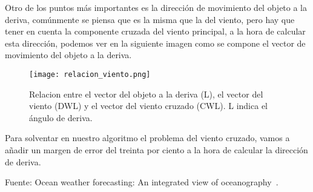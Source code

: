 Otro de los puntos más importantes es la dirección de movimiento del 
objeto a la deriva, comúnmente se piensa que es la misma que la del viento,
 pero hay que tener en cuenta la componente cruzada del viento principal, a
 la hora de calcular esta dirección, podemos ver en la siguiente imagen como 
se compone el vector de movimiento del objeto a la deriva.


\begin{figure}[h]
\texttt{[image: relacion\_viento.png]} 
\caption{Relacion entre el vector del objeto a la deriva (L), 
el vector del viento (DWL) y el vector del viento cruzado (CWL). L indica el ángulo de deriva. }
\end{figure}


Para solventar en nuestro algoritmo el problema del viento cruzado, vamos a añadir un margen de 
error del treinta por ciento a la hora de calcular la dirección de deriva. 

Fuente: Ocean weather forecasting: An integrated view of oceanography~\cite{DDERIVA}.